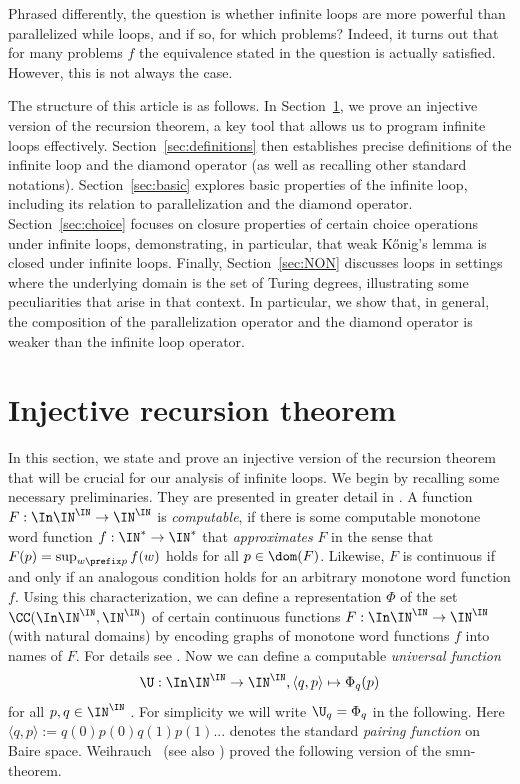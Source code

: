 \documentclass{lmcs}
\begin{document}
\noindent
Phrased differently, the question is whether infinite loops are more powerful than parallelized while loops,
and if so, for which problems?
Indeed, it turns out that for many problems $f$ the equivalence stated in the question is actually satisfied.
However, this is not always the case.

The structure of this article is as follows. 
In Section~\ref{sec:recursion}, we prove an injective version of the recursion theorem, a key tool that allows us to program infinite loops effectively. 
Section~\ref{sec:definitions} then establishes precise definitions of the infinite loop and the diamond operator (as well as recalling other standard notations). Section~\ref{sec:basic} explores basic properties of the infinite loop, including its relation to parallelization and the diamond operator. Section~\ref{sec:choice} focuses on closure properties of certain choice operations under infinite loops, demonstrating, in particular, that weak K\H{o}nig's lemma is closed under infinite loops. Finally, Section~\ref{sec:NON} discusses loops in settings where the underlying domain is the set of Turing degrees, illustrating some peculiarities that arise in that context. In particular, we show that, in general, the composition of the parallelization operator
and the diamond operator is weaker than the infinite loop operator.


\section{Injective recursion theorem}
\label{sec:recursion}

In this section, we state and prove an injective version of the recursion theorem that will be crucial for our analysis of infinite loops. We begin by recalling some necessary preliminaries. They 
are presented in greater detail in \cite{Bra23}.
A function $F:\In\IN^\IN\to\IN^\IN$ is {\em computable}, if there is some computable monotone word function 
${f:\IN^*\to\IN^*}$
that {\em approximates} $F$ in the sense that $F(p)=\sup_{w\prefix p}f(w)$ holds for all $p\in\dom(F)$. 
Likewise, $F$ is continuous if and only if an analogous condition holds for an arbitrary monotone word function $f$.
Using this characterization, we can define a representation $\Phi$ of the set $\CC(\In\IN^\IN,\IN^\IN)$ of certain continuous functions 
$F:\In\IN^\IN\to\IN^\IN$ (with natural domains) by encoding graphs of monotone word functions $f$ into names of $F$. 
For details see \cite{Wei87}.
Now we can define a computable {\em universal function} 
\[\U:\In\IN^\IN\to\IN^\IN,\langle q,p\rangle\mapsto\Phi_q(p)\] 
for all $p,q\in\IN^\IN$ \cite[Theorem~3.2.16~(1)]{Wei87}. 
For simplicity we will write $\U_q=\Phi_q$ in the following.
Here $\langle q,p\rangle:=q(0)p(0)q(1)p(1)...$ denotes the standard {\em pairing function} on Baire space.
Weihrauch~\cite[Theorems~3.5, 2.10, Corollary~2.11]{Wei85} (see also \cite[Theorem~3.2.16]{Wei87}) proved the following version of the smn-theorem.
\end{document}
